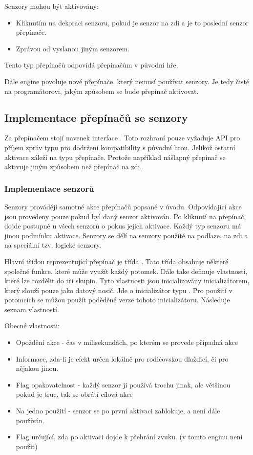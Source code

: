 Senzory mohou být aktivovány:

\begin{itemize}
\item Kliknutím na dekoraci senzoru, pokud je senzor na zdi a je to poslední senzor přepínače.
\item Zprávou od vyslanou jiným senzorem.
\end{itemize}
Tento typ přepínačů odpovídá přepínačům v původní hře.

Dále engine povoluje nové přepínače, který nemusí používat senzory. Je tedy čistě na programátorovi, jakým 
způsobem se bude přepínač aktivovat. 

\subsection{Implementace přepínačů se senzory}
Za přepínačem stojí navenek interface . Toto rozhraní pouze vyžaduje API pro příjem 
zpráv typu   pro dodržení kompatibility s původní hrou. Jelikož ostatní aktivace záleží
na typu přepínače. Protože například nášlapný přepínač se aktivuje jiným způsobem než přepínač na zdi.

\subsubsection{Implementace senzorů}
Senzory provádějí samotné akce přepínačů popsané v úvodu. Odpovídající akce jsou provedeny pouze pokud
byl daný senzor aktivován. Po kliknutí na přepínač, dojde postupně u všech senzorů o pokus jejich aktivace.
Každý typ senzoru má jinou podmínku aktivace. Senzory se dělí na senzory použité na podlaze,  na zdi a
na speciální tzv. logické senzory.

Hlavní třídou reprezentující přepínač je třída . Tato třída obsahuje některé společné funkce,
které může využít každý potomek. Dále take definuje vlastnosti, které lze rozdělit do tří skupin.
Tyto vlastnosti jsou inicializovány inicializátorem, který slouží pouze jako datový nosič. Jde o inicializátor
typu . Pro použití v potomcích se můžou použít poděděné verze tohoto inicializátoru.
Následuje seznam vlastností.

Obecné vlastnosti:
\begin{itemize}
\item Opoždění akce - čas v milisekundách, po kterém se provede případná akce 
\item Informace, zda-li je efekt určen lokálně pro rodičovskou dlaždici, či pro nějakou jinou.
\item Flag opakovatelnost - každý senzor ji používá trochu jinak, ale většinou pokud je true, tak se obrátí cílová akce
\item Na jedno použití - senzor se po první aktivaci zablokuje, a není dále používán.
\item Flag určující, zda po aktivaci dojde k přehrání zvuku. (v tomto enginu není použit)
\end{itemize}

